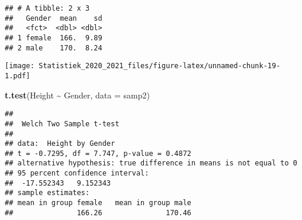 \documentclass[
  12pt,dutch,coursenotes]{book}
\newenvironment{Shaded}{\begin{snugshade}}{\end{snugshade}}
\newcommand{\DataTypeTok}[1]{\textcolor[rgb]{0.13,0.29,0.53}{#1}}
\newcommand{\DecValTok}[1]{\textcolor[rgb]{0.00,0.00,0.81}{#1}}
\newcommand{\KeywordTok}[1]{\textcolor[rgb]{0.13,0.29,0.53}{\textbf{#1}}}
\newcommand{\NormalTok}[1]{#1}
\newcommand{\OperatorTok}[1]{\textcolor[rgb]{0.81,0.36,0.00}{\textbf{#1}}}
\newcommand{\OtherTok}[1]{\textcolor[rgb]{0.56,0.35,0.01}{#1}}
\newcommand{\StringTok}[1]{\textcolor[rgb]{0.31,0.60,0.02}{#1}}
\theoremstyle{definition}
\theoremstyle{definition}
\theoremstyle{definition}
\theoremstyle{remark}
\begin{document}
\begin{verbatim}
## # A tibble: 2 x 3
##   Gender  mean    sd
##   <fct>  <dbl> <dbl>
## 1 female  166.  9.89
## 2 male    170.  8.24
\end{verbatim}

\begin{Shaded}
\end{Shaded}

\texttt{[image: Statistiek\_2020\_2021\_files/figure-latex/unnamed-chunk-19-1.pdf]}

\begin{Shaded}
\begin{Highlighting}[]
\KeywordTok{t.test}\NormalTok{(Height }\OperatorTok{\textasciitilde{}}\StringTok{ }\NormalTok{Gender, }\DataTypeTok{data =}\NormalTok{ samp2)}
\end{Highlighting}
\end{Shaded}

\begin{verbatim}
## 
## 	Welch Two Sample t-test
## 
## data:  Height by Gender
## t = -0.7295, df = 7.747, p-value = 0.4872
## alternative hypothesis: true difference in means is not equal to 0
## 95 percent confidence interval:
##  -17.552343   9.152343
## sample estimates:
## mean in group female   mean in group male 
##               166.26               170.46
\end{verbatim}
\end{document}
